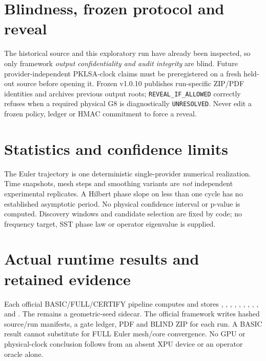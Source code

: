 \documentclass[11pt,a4paper]{article}
\begin{document}
\section{Blindness, frozen protocol and reveal}
The historical source and this exploratory run have already been inspected, so only framework \emph{output confidentiality and audit integrity} are blind. Future provider-independent PKLSA-clock claims must be preregistered on a fresh held-out source before opening it. Frozen v1.0.10 publishes run-specific ZIP/PDF identities and archives previous output roots; \texttt{REVEAL\_IF\_ALLOWED} correctly refuses when a required physical G8 is diagnostically \texttt{UNRESOLVED}. Never edit a frozen policy, ledger or HMAC commitment to force a reveal.

\section{Statistics and confidence limits}
The Euler trajectory is one deterministic single-provider numerical realization. Time snapshots, mesh steps and smoothing variants are \emph{not} independent experimental replicates. A Hilbert phase slope on less than one cycle has no established asymptotic period. No physical confidence interval or p-value is computed. Discovery windows and candidate selection are fixed by code; no frequency target, SST phase law or operator eigenvalue is supplied.

\section{Actual runtime results and retained evidence}
Each official BASIC/FULL/CERTIFY pipeline computes and stores
,
,
,
,
,
,
,
,
, and
.
The  remains a geometric-seed sidecar. The official framework writes hashed source/run manifests, a gate ledger, PDF and BLIND ZIP for each run. A BASIC result cannot substitute for FULL Euler mesh/core convergence. No GPU or physical-clock conclusion follows from an absent XPU device or an operator oracle alone.
\end{document}
